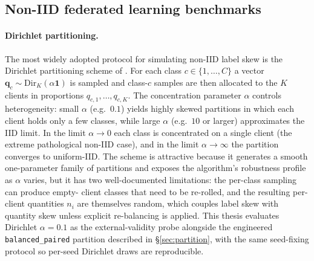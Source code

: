\documentclass[11pt,a4paper]{article}
\begin{document}
\subsection{Non-IID federated learning benchmarks}
\label{sec:rw-benchmarks}

\paragraph{Dirichlet partitioning.}
The most widely adopted protocol for simulating non-IID label skew is the
Dirichlet partitioning scheme of \citet{hsu2019dirichlet}. For each class
$c \in \{1,\dots,C\}$ a vector
$\bm{q}_c \sim \mathrm{Dir}_K(\alpha\bm{1})$ is sampled and class-$c$ samples
are then allocated to the $K$ clients in proportions $q_{c,1}, \dots, q_{c,K}$.
The concentration parameter $\alpha$ controls heterogeneity: small $\alpha$
(e.g.\ $0.1$) yields highly skewed partitions in which each client holds only
a few classes, while large $\alpha$ (e.g.\ $10$ or larger) approximates the
IID limit. In the limit $\alpha \to 0$ each class is concentrated on a
single client (the extreme pathological non-IID case), and in the limit
$\alpha \to \infty$ the partition converges to uniform-IID. The scheme is
attractive because it generates a smooth one-parameter family of partitions
and exposes the algorithm's robustness profile as $\alpha$ varies, but it has
two well-documented limitations: the per-class sampling can produce empty-
client classes that need to be re-rolled, and the resulting per-client
quantities $n_i$ are themselves random, which couples label skew with
quantity skew unless explicit re-balancing is applied. This thesis evaluates
Dirichlet $\alpha = 0.1$ as the external-validity probe alongside the
engineered \texttt{balanced\_paired} partition described in
\S\ref{sec:partition}, with the same seed-fixing protocol so per-seed
Dirichlet draws are reproducible.
\end{document}
